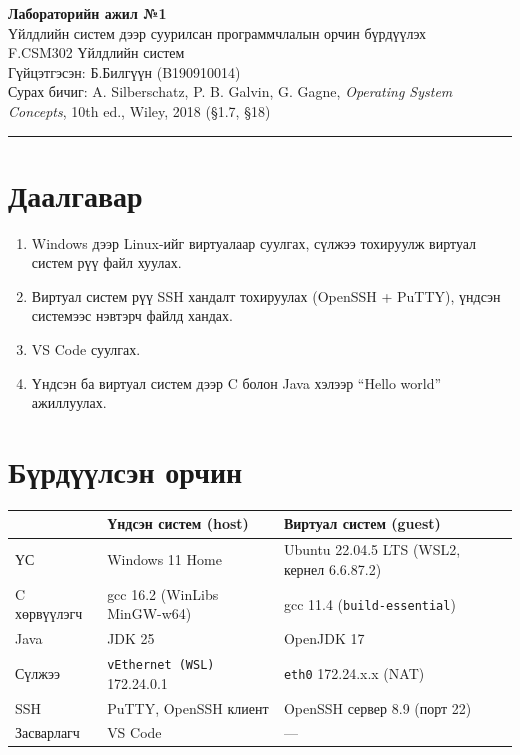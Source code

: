 \documentclass[12pt,a4paper]{article}
\begin{document}
\begin{center}
  {\Large\bfseries Лабораторийн ажил №1}\\[0.4em]
  {\large Үйлдлийн систем дээр суурилсан программчлалын орчин бүрдүүлэх}\\[0.8em]
  F.CSM302 Үйлдлийн систем\\
  Гүйцэтгэсэн: Б.Билгүүн (B190910014)\\[0.3em]
  Сурах бичиг: A. Silberschatz, P. B. Galvin, G. Gagne, \textit{Operating System Concepts}, 10th ed., Wiley, 2018 (§1.7, §18)
\end{center}
\hrule
\bigskip

\section{Даалгавар}
\begin{enumerate}[leftmargin=1.5em]
  \item Windows дээр Linux-ийг виртуалаар суулгах, сүлжээ тохируулж виртуал систем рүү файл хуулах.
  \item Виртуал систем рүү SSH хандалт тохируулах (OpenSSH + PuTTY), үндсэн системээс нэвтэрч файлд хандах.
  \item VS Code суулгах.
  \item Үндсэн ба виртуал систем дээр C болон Java хэлээр “Hello world” ажиллуулах.
\end{enumerate}

\section{Бүрдүүлсэн орчин}
\begin{center}
\begin{tabular}{l>{\raggedright}p{5.3cm}>{\raggedright\arraybackslash}p{5.8cm}}
\toprule
 & Үндсэн систем (host) & Виртуал систем (guest)\\
\midrule
ҮС & Windows 11 Home & Ubuntu 22.04.5 LTS (WSL2, кернел 6.6.87.2)\\
C хөрвүүлэгч & gcc 16.2 (WinLibs MinGW-w64) & gcc 11.4 (\texttt{build-essential})\\
Java & JDK 25 & OpenJDK 17\\
Сүлжээ & \texttt{vEthernet (WSL)} 172.24.0.1 & \texttt{eth0} 172.24.x.x (NAT)\\
SSH & PuTTY, OpenSSH клиент & OpenSSH сервер 8.9 (порт 22)\\
Засварлагч & VS Code & —\\
\bottomrule
\end{tabular}
\end{center}
\end{document}
